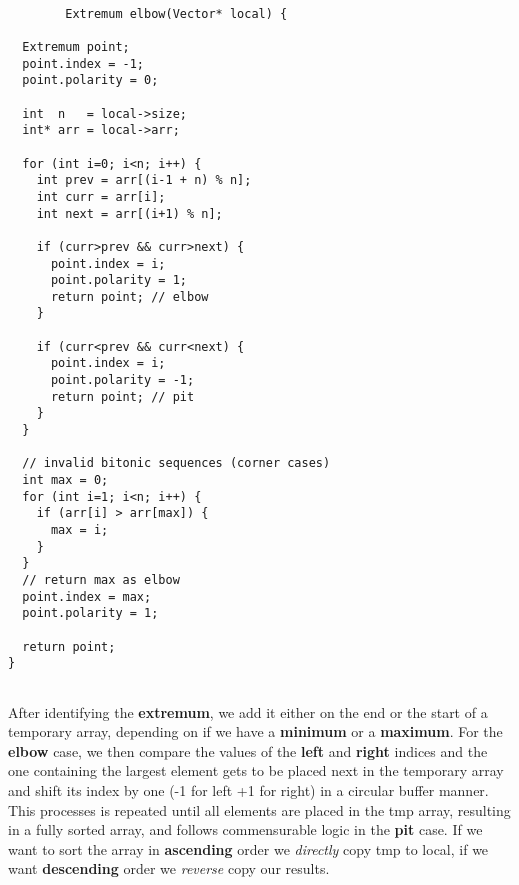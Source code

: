 \documentclass[12pt]{report}
\begin{document}
        \begin{lstlisting}[style=cstyle] 
        
        Extremum elbow(Vector* local) {

  Extremum point;
  point.index = -1;
  point.polarity = 0;

  int  n   = local->size;
  int* arr = local->arr;

  for (int i=0; i<n; i++) {
    int prev = arr[(i-1 + n) % n];
    int curr = arr[i];
    int next = arr[(i+1) % n];

    if (curr>prev && curr>next) {
      point.index = i;
      point.polarity = 1;
      return point; // elbow
    }

    if (curr<prev && curr<next) {
      point.index = i;
      point.polarity = -1;
      return point; // pit
    }
  }

  // invalid bitonic sequences (corner cases)
  int max = 0;
  for (int i=1; i<n; i++) {
    if (arr[i] > arr[max]) {
      max = i;
    }
  }
  // return max as elbow
  point.index = max;
  point.polarity = 1;

  return point;
}
            
\end{lstlisting}
After identifying the \textbf{extremum}, we add it either on the end or the start of a temporary array, depending on if we have a \textbf{minimum} or a \textbf{maximum}. For the \textbf{elbow} case, we then compare the values of the \textbf{left} and \textbf{right} indices and the one containing the largest element gets to be placed next in the temporary array and shift its index by one (-1 for left +1 for right) in a circular buffer manner. This processes is repeated until all elements are placed in the tmp array, resulting in a fully sorted array, and follows commensurable logic in the \textbf{pit} case. If we want to sort the array in \textbf{ascending} order we \textit{directly} copy tmp to local, if we want \textbf{descending} order we \textit{reverse} copy our results. 
\newpage
\end{document}
